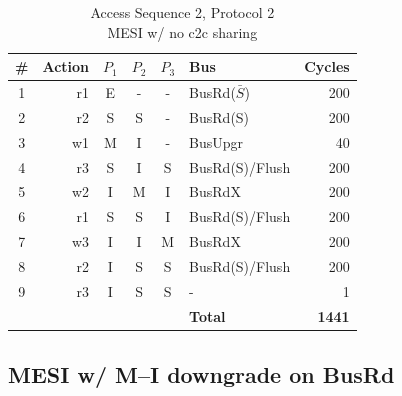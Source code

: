 \documentclass[12pt, letterpaper]{report}
\begin{document}
\begin{table}[H]
	\setlength{\extrarowheight}{.5ex}
	\centering
	\begin{tabular}{ |c|r|c|c|c|l|r| }
		\hline
		\textbf{\#} & \textbf{Action} & \textbf{$P_1$} & \textbf{$P_{2}$} & \textbf{$P_3$} & \textbf{Bus} & \textbf{Cycles} \\
		\hline
		1 & r1 & E & - & - & BusRd($\bar{S}$) & 200 \\
		\hline
		2 & r2 & S & S & - & BusRd(S) & 200 \\
		\hline
		3 & w1 & M & I & - & BusUpgr & 40 \\
		\hline
		4 & r3 & S & I & S & BusRd(S)/Flush & 200 \\
		\hline
		5 & w2 & I & M & I & BusRdX & 200 \\
		\hline
		6 & r1 & S & S & I & BusRd(S)/Flush & 200 \\
		\hline
		7 & w3 & I & I & M & BusRdX & 200 \\
		\hline
		8 & r2 & I & S & S & BusRd(S)/Flush & 200 \\
		\hline
		9 & r3 & I & S & S & - & 1 \\
		\hline \hline \hline
		\cellcolor{null} & \cellcolor{null} & \cellcolor{null} & \cellcolor{null} & \cellcolor{null} & \textbf{Total} & \textbf{1441} \\
		\hline
	\end{tabular}
	\caption{Access Sequence 2, Protocol 2\\MESI w/ no c2c sharing}
\end{table}


\subsection{MESI w/ M--I downgrade on BusRd}
\end{document}
